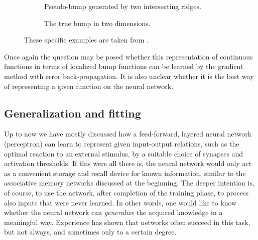 \begin{figure}[h!t]
\centering
{}
\begin{subfigure}[ht]{0.95\textwidth}
	\centering
	\tikzexternalenable
	\tikzexternaldisable
	\caption{Pseudo-bump generated by two intersecting ridges.}\label{2DBump1}
\end{subfigure}

\vspace{\baselineskip}\noindent
\begin{subfigure}[ht]{0.95\textwidth}
	\centering
	\tikzexternalenable
	\tikzexternaldisable
	\caption{The true bump in two dimensions.}\label{2DBump2}
\end{subfigure}
\caption{These specific examples are taken from .}\label{2DBump}
\end{figure}

Once again the question may be posed whether this representation of continuous functions in terms of localized bump functions can be learned by the gradient method with error back-propagation. It is also unclear whether it is the best way of representing a given function on the neural network.
\subsection{Generalization and fitting}\label{sec:Generalizationandfitting}
Up to now we have mostly discussed how a feed-forward, layered neural network (perceptron) can learn to represent given input-output relations, such as the optimal reaction to an external stimulus, by a suitable choice of synapses and activation thresholds. If this were all there is, the neural network would only act as a convenient storage and recall device for known information, similar to the associative memory networks discussed at the beginning. The deeper intention is, of course, to use the network, after completion of the training phase, to process also inputs that were never learned. In other words, one would like to know whether the neural network can \emph{generalize} the acquired knowledge in a meaningful way. Experience has shown that networks often succeed in this task, but not always, and sometimes only to a certain degree.

